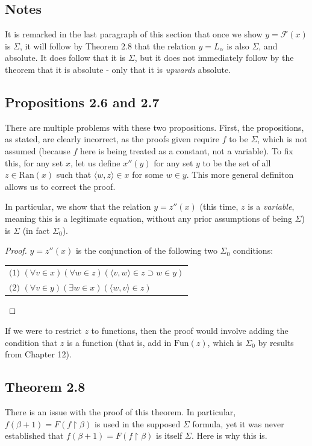 \documentclass{article}
\theoremstyle{definition}
\begin{document}
\subsection*{Notes}
It is remarked in the last paragraph of this section that once we show $y=\mathcal{F}(x)$ is $\Sigma$, it will 
follow by Theorem 2.8 that the relation $y=L_\alpha$ is also $\Sigma$, and absolute. It does follow that it is $\Sigma$, but 
it does not immediately follow by the theorem that it is absolute - only that it is \textit{upwards} absolute.

\subsection*{Propositions 2.6 and 2.7}
There are multiple problems with these two propositions. First, the propositions, as stated, are clearly incorrect, as the proofs given 
require $f$ to be $\Sigma$, which is not assumed (because $f$ here is being treated as a constant, not a variable). To fix this, for any 
set $x$, let us define $x''(y)$ for any set $y$ to be the set of all $z\in\textrm{Ran}(x)$ such that $\langle w,z\rangle\in x$ for 
some $w\in y$. This more general definiton allows us to correct the proof.

In particular, we show that the relation $y=z''(x)$ (this time, $z$ is a \textit{variable}, meaning this is a legitimate equation, without 
any prior assumptions of being $\Sigma$) is $\Sigma$ (in fact $\Sigma_0$).

\begin{proof}
$y=z''(x)$ is the conjunction of the following two $\Sigma_0$ conditions:
\begin{center}
\begin{tabular}{l}
$\textrm{(1) }(\forall v\in x)(\forall w\in z)(\langle v,w\rangle\in z\supset w\in y)$ \\
$\textrm{(2) }(\forall v\in y)(\exists w\in x)(\langle w,v\rangle\in z)$
\end{tabular}
\end{center}
\end{proof}
If we were to restrict $z$ to functions, then the proof would involve adding the condition 
that $z$ is a function (that is, add in $\textrm{Fun}(z)$, which is $\Sigma_0$ by results from Chapter 12).

\subsection*{Theorem 2.8}
There is an issue with the proof of this theorem. In particular, $f(\beta+1)=F(f\restriction\beta)$ is used in the 
supposed $\Sigma$ formula, yet it was never established that $f(\beta+1)=F(f\restriction\beta)$ is itself $\Sigma$. Here is why this is.
\end{document}
